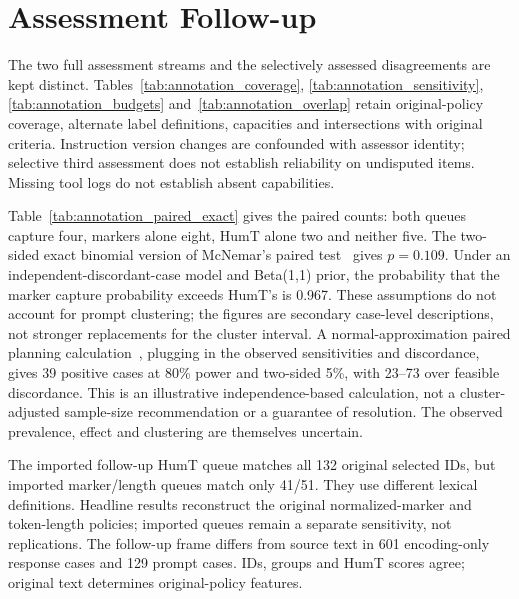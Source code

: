 \section{Assessment Follow-up}\label{app:assessment}
The two full assessment streams and the selectively assessed disagreements are kept distinct. Tables~\ref{tab:annotation_coverage}, \ref{tab:annotation_sensitivity}, \ref{tab:annotation_budgets} and~\ref{tab:annotation_overlap} retain original-policy coverage, alternate label definitions, capacities and intersections with original criteria. Instruction version changes are confounded with assessor identity; selective third assessment does not establish reliability on undisputed items. Missing tool logs do not establish absent capabilities.






Table~\ref{tab:annotation_paired_exact} gives the paired counts: both queues capture four, markers alone eight, HumT alone two and neither five. The two-sided exact binomial version of McNemar's paired test~\cite{mcnemar1947} gives $p=0.109$. Under an independent-discordant-case model and Beta(1,1) prior, the probability that the marker capture probability exceeds HumT's is 0.967. These assumptions do not account for prompt clustering; the figures are secondary case-level descriptions, not stronger replacements for the cluster interval. A normal-approximation paired planning calculation~\cite{connor1987paired}, plugging in the observed sensitivities and discordance, gives 39 positive cases at 80\% power and two-sided 5\%, with 23--73 over feasible discordance. This is an illustrative independence-based calculation, not a cluster-adjusted sample-size recommendation or a guarantee of resolution. The observed prevalence, effect and clustering are themselves uncertain.

The imported follow-up HumT queue matches all 132 original selected IDs, but imported marker/length queues match only 41/51. They use different lexical definitions. Headline results reconstruct the original normalized-marker and token-length policies; imported queues remain a separate sensitivity, not replications. The follow-up frame differs from source text in 601 encoding-only response cases and 129 prompt cases. IDs, groups and HumT scores agree; original text determines original-policy features.

